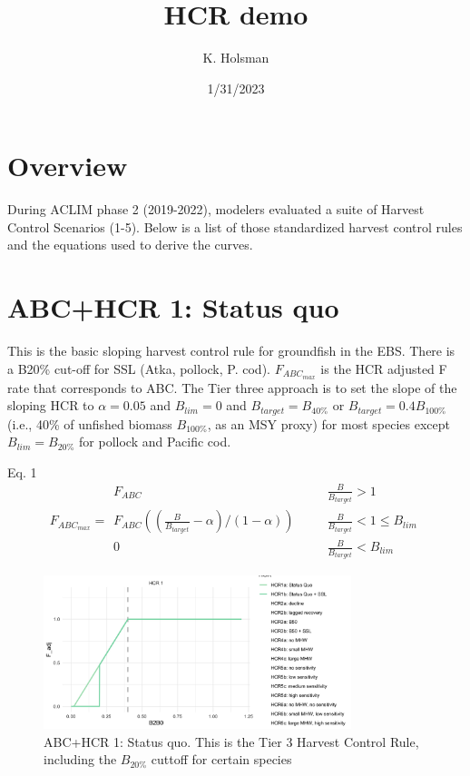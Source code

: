 \documentclass[
]{article}
\title{HCR demo}
\author{K. Holsman}
\date{1/31/2023}
\begin{document}
\maketitle

{
\setcounter{tocdepth}{3}
\tableofcontents
}
\section{Overview}\label{overview}

During ACLIM phase 2 (2019-2022), modelers evaluated a suite of Harvest
Control Scenarios (1-5). Below is a list of those standardized harvest
control rules and the equations used to derive the curves.

\section{ABC+HCR 1: Status quo}\label{abchcr-1-status-quo}

This is the basic sloping harvest control rule for groundfish in the
EBS. There is a B20\% cut-off for SSL (Atka, pollock, P. cod).
\(F_{ABC_{max}}\) is the HCR adjusted F rate that corresponds to ABC.
The Tier three approach is to set the slope of the sloping HCR to
\(\alpha = 0.05\) and \(B_{lim} = 0\) and \(B_{target} = B_{40\%}\) or
\(B_{target} = 0.4B_{100\%}\) (i.e., 40\% of unfished biomass
\(B_{100\%}\), as an MSY proxy) for most species except
\(B_{lim} = B_{20\%}\) for pollock and Pacific cod.

Eq. 1 \[F_{ABC_{max}} = \begin{array}{ll}  
 F_{ABC} &~~~~~~~~ \frac{B}{B_{target}}>1 \\  
 F_{ABC}((\frac{B}{B_{target}}-\alpha)/(1-\alpha)) &~~~~~~~~ \frac{B}{B_{target}} < 1 \leq B_{lim} \\  
 0 &~~~~~~~~ \frac{B}{B_{target}} < B_{lim}  
 \end{array}\]

\begin{figure}
\centering
\includegraphics[width=0.8\textwidth,height=\textheight]{../../Figs/HCR_figs/HCR1.png}
\caption{ABC+HCR 1: Status quo. This is the Tier 3 Harvest Control Rule,
including the \(B_{20\%}\) cuttoff for certain species}
\end{figure}
\end{document}
